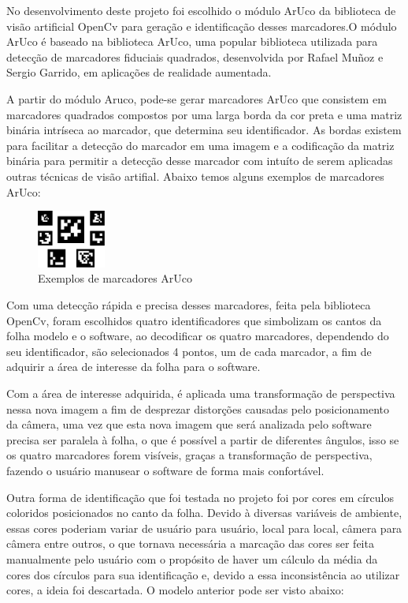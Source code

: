 \documentclass[12pt]{report}
\begin{document}
No desenvolvimento deste projeto foi escolhido o módulo ArUco da biblioteca de visão artificial OpenCv para geração e identificação desses marcadores.O módulo ArUco é baseado na biblioteca ArUco, uma popular biblioteca utilizada para detecção de marcadores fiduciais quadrados, desenvolvida por Rafael Muñoz e Sergio Garrido, em aplicações de realidade aumentada.

A partir do módulo Aruco, pode-se gerar marcadores ArUco que consistem em marcadores quadrados compostos por uma larga borda da cor preta e uma matriz binária intríseca ao marcador, que determina seu identificador. As bordas existem para facilitar a detecção do marcador em uma imagem e a codificação da matriz binária para permitir a detecção desse marcador com intuíto de serem aplicadas outras técnicas de visão artifial. Abaixo temos alguns exemplos de marcadores ArUco:

\begin{figure}[H]
  \centering
    \includegraphics[width=0.2\textwidth]{imagens/markers.jpg}
    \caption{Exemplos de marcadores ArUco}
  \label{fig:arucoMarkers}
\end{figure}

Com uma detecção rápida e precisa desses marcadores, feita pela biblioteca OpenCv, foram escolhidos quatro identificadores que simbolizam os cantos da folha modelo e o software, ao decodificar os quatro marcadores, dependendo do seu identificador, são selecionados 4 pontos, um de cada marcador, a fim de adquirir a área de interesse da folha para o software.

Com a área de interesse adquirida, é aplicada uma transformação de perspectiva nessa nova imagem a fim de  desprezar distorções causadas pelo posicionamento da câmera, uma vez que esta nova imagem que será analizada pelo software precisa ser paralela à folha, o que é possível a partir de diferentes ângulos, isso se os quatro marcadores forem visíveis, graças a transformação de perspectiva, fazendo o usuário manusear o software de forma mais confortável.

Outra forma de identificação que foi testada no projeto foi por cores em círculos coloridos posicionados no canto da folha. Devido à diversas variáveis de ambiente, essas cores poderiam variar de usuário para usuário, local para local, câmera para câmera entre outros, o que tornava necessária a marcação das cores ser feita manualmente pelo usuário com o propósito de haver um cálculo da média da cores dos círculos para sua identificação e, devido a essa inconsistência ao utilizar cores, a ideia foi descartada. O modelo anterior pode ser visto abaixo:
\end{document}
